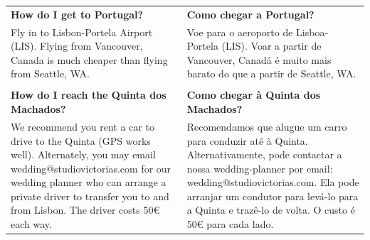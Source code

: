 \documentclass[6pt]{article}
\begin{document}
\pagestyle{empty}

\small
\begin{tabular}{p{2.125in}|p{2.125in}}
{\bf How do I get to Portugal?} & {\bf Como chegar a Portugal?}\\
  Fly in to Lisbon-Portela Airport (LIS). Flying from Vancouver, Canada is much cheaper than flying from Seattle, WA.
  &
  Voe para o aeroporto de Lisboa-Portela (LIS). Voar a partir de Vancouver, Canadá é muito mais barato do que a partir de Seattle, WA.
  \\
  &\\
  {\bf How do I reach the Quinta dos Machados?} & {\bf Como chegar à Quinta dos Machados?}\\
  We recommend you rent a car to drive to the Quinta (GPS works well). Alternately, you may email wedding@studiovictorias.com for our wedding planner who can arrange a private driver to transfer you to and from Lisbon. The driver costs 50\euro{} each way.
  &
  Recomendamos que alugue um carro para conduzir até à Quinta. Alternativamente, pode contactar a nossa wedding-planner por email: wedding@studiovictorias.com. Ela pode arranjar um condutor para levá-lo para a Quinta e trazê-lo de volta. O custo é 50\euro{} para cada lado.\\


\end{tabular}
\end{document}
